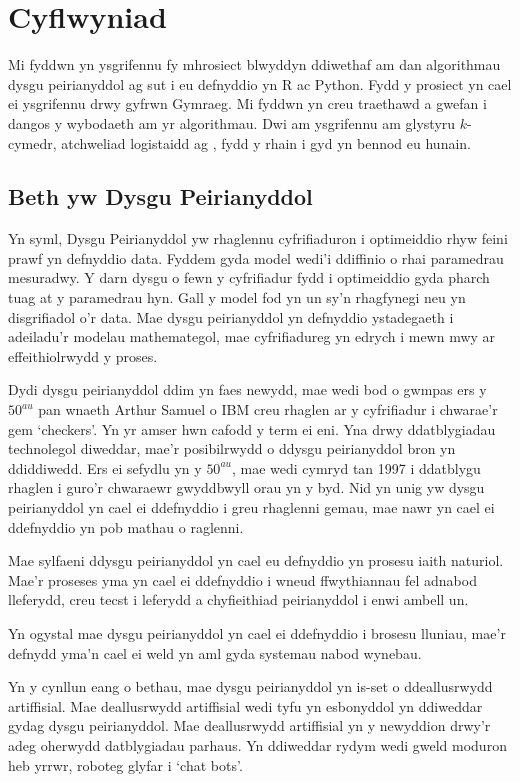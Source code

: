 \chapter{Cyflwyniad}\label{cha:introduction}

Mi fyddwn yn ysgrifennu fy mhrosiect blwyddyn ddiwethaf am dan algorithmau dysgu peirianyddol ag sut i eu defnyddio yn R ac Python. Fydd y prosiect yn cael ei ysgrifennu drwy gyfrwn Gymraeg. Mi fyddwn yn creu traethawd a gwefan i dangos y wybodaeth am yr algorithmau. Dwi am ysgrifennu am glystyru $k$-cymedr, atchweliad logistaidd ag , fydd y rhain i gyd yn bennod eu hunain.    

\section{Beth yw Dysgu Peirianyddol}\label{sec:intro_pd}

Yn syml, Dysgu Peirianyddol yw rhaglennu cyfrifiaduron i optimeiddio rhyw feini prawf yn defnyddio data. Fyddem gyda model wedi'i ddiffinio o rhai paramedrau mesuradwy. Y darn dysgu o fewn y cyfrifiadur fydd i optimeiddio gyda pharch tuag at y paramedrau hyn. Gall y model fod yn un sy'n rhagfynegi neu yn disgrifiadol o'r data. Mae dysgu peirianyddol yn defnyddio ystadegaeth i adeiladu'r modelau mathemategol, mae cyfrifiadureg yn edrych i mewn mwy ar effeithiolrwydd y proses. \cite{dysgu-peirianyddol2}

Dydi dysgu peirianyddol ddim yn faes newydd, mae wedi bod o gwmpas ers y $50^{au}$ pan wnaeth Arthur Samuel o IBM creu rhaglen ar y cyfrifiadur i chwarae'r gem `checkers'. Yn yr amser hwn cafodd y term ei eni. Yna drwy ddatblygiadau technolegol diweddar, mae'r posibilrwydd o ddysgu peirianyddol bron yn ddiddiwedd. Ers ei sefydlu yn y $50^{au}$, mae wedi cymryd tan 1997 i ddatblygu rhaglen i guro'r chwaraewr gwyddbwyll orau yn y byd. Nid yn unig yw dysgu peirianyddol yn cael ei ddefnyddio i greu rhaglenni gemau, mae nawr yn cael ei ddefnyddio yn pob mathau o raglenni.

Mae sylfaeni ddysgu peirianyddol yn cael eu defnyddio yn prosesu iaith naturiol. Mae'r proseses yma yn cael ei ddefnyddio i wneud ffwythiannau fel adnabod lleferydd, creu tecst i leferydd a chyfieithiad peirianyddol i enwi ambell un.

Yn ogystal mae dysgu peirianyddol yn cael ei ddefnyddio i brosesu lluniau, mae'r defnydd yma'n cael ei weld yn aml gyda systemau nabod wynebau.

Yn y cynllun eang o bethau, mae dysgu peirianyddol yn is-set o ddeallusrwydd artiffisial. Mae deallusrwydd artiffisial wedi tyfu yn esbonyddol yn ddiweddar gydag dysgu peirianyddol. Mae deallusrwydd artiffisial yn y newyddion drwy'r adeg oherwydd datblygiadau parhaus. Yn ddiweddar rydym wedi gweld moduron heb yrrwr, roboteg glyfar i `chat bots'.

